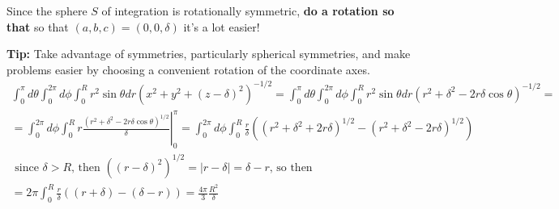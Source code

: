 \documentclass[twoside]{amsart}
\theoremstyle{plain}
\theoremstyle{definition}
\begin{document}
Since the sphere $S$ of integration is rotationally symmetric, \textbf{do a rotation so that} so that $(a,b,c) = (0,0,\delta)$ \large{ it's a lot easier! }

\large{ \textbf{ Tip: } Take advantage of symmetries, particularly spherical symmetries, and make problems easier by choosing a convenient rotation of the coordinate axes. }
\normalsize
\[
\begin{gathered}
  \int_0^{\pi} d\theta \int_0^{2\pi} d\phi \int_0^R r^2 \sin{\theta} dr ( x^2 +y^2 + (z-\delta)^2 )^{-1/2} = \int_0^{\pi} d\theta \int_0^{2\pi} d\phi \int_0^R r^2 \sin{\theta} dr (r^2 + \delta^2 - 2r\delta \cos{\theta})^{-1/2} = \\
 = \int_0^{2\pi} d\phi \int_0^R r \left. \frac{ (r^2 + \delta^2 - 2r \delta \cos{\theta})^{1/2}}{ \delta} \right|_0^{\pi} = \int_0^{2\pi} d\phi \int_0^R \frac{r}{\delta} \left( (r^2 + \delta^2 + 2r\delta )^{1/2} - (r^2 + \delta^2 - 2r\delta)^{1/2} \right) \\
 \text{ since  $\delta > R$, then $((r - \delta)^2)^{1/2} = |r- \delta| = \delta - r$, so then } \\ 
 = 2\pi \int_0^R \frac{r}{\delta} ((r+\delta) - (\delta - r) ) = \boxed{ \frac{ 4\pi }{3} \frac{R^2}{\delta} }
\end{gathered}
\]
\end{document}
